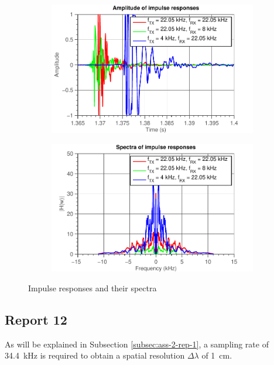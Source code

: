 \documentclass[11pt,titlepage]{report}
\begin{document}
\begin{figure}[H]
	\centering
	\begin{subfigure}{0.49\textwidth}
		\includegraphics[width=\textwidth]{../../deliverable-7-resources/figures/ass-1/report-11-12-13/ass-1-report-11-time.pdf}
	\end{subfigure}
	\begin{subfigure}{0.49\textwidth}
		\includegraphics[width=\textwidth]{../../deliverable-7-resources/figures/ass-1/report-11-12-13/ass-1-report-11.pdf}
	\end{subfigure}
	\caption{Impulse responses and their spectra}
	\label{fig:ass-1-rep-11-imp}
\end{figure}

\subsection{Report 12}
\label{subsec:ass-1-rep-12}
As will be explained in Subsection \ref{subsec:ass-2-rep-1}, a sampling rate of \SI{34.4}{kHz} is required to obtain a spatial resolution $\Delta \lambda$ of \SI{1}{cm}.
\end{document}
